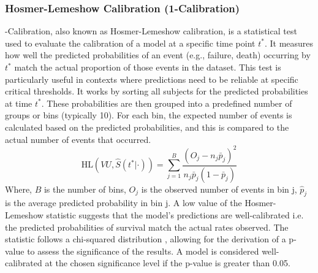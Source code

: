 \subsubsection{Hosmer-Lemeshow Calibration (1-Calibration)}
-Calibration, also known as Hosmer-Lemeshow calibration, is a statistical test used to evaluate the calibration of a model at a specific time point \(t^{*}\). \parencite{haider_effective_2018} It measures how well the predicted probabilities of an event (e.g., failure, death) occurring by \(t^{*}\) match the actual proportion of those events in the dataset. This test is particularly useful in contexts where predictions need to be reliable at specific critical thresholds. It works by sorting all subjects for the predicted probabilities at time \(t^{*}\). These probabilities are then grouped into a predefined number of groups or bins (typically 10). For each bin, the expected number of events is calculated based on the predicted probabilities, and this is compared to the actual number of events that occurred.
\begin{equation} \label{eq:c1}\text{HL}(VU, \hat{S}(t^* | \cdot)) = \sum_{j=1}^B \frac{(O_j - n_j \bar{p}_j)^2}{n_j \bar{p}_j (1 - \bar{p}_j)}\end{equation}
\noindent Where, \(B\) is the number of bins, \(O_{j}\) is the observed number of events in bin j, \(\hat{p}_{j}\) is the average predicted probability in bin j. A low value of the Hosmer-Lemeshow statistic \parencite{qi_effective_2023} suggests that the model's predictions are well-calibrated i.e. the predicted probabilities of survival match the actual rates observed. The statistic follows a chi-squared distribution \parencite{qi_effective_2023}, allowing for the derivation of a p-value to assess the significance of the results. A model is considered well-calibrated at the chosen significance level if the p-value is greater than 0.05.

